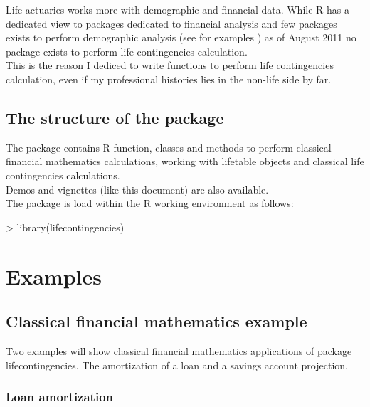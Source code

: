 \documentclass[a4paper]{article}
\begin{document}
Life actuaries works more with demographic and financial data. While R has a dedicated view to packages dedicated to financial analysis and 
few packages exists to perform demographic analysis (see for examples \cite{demography}) as of August 2011 no package exists to perform 
life contingencies calculation.\\
This is the reason I dediced to write functions to perform life contingencies calculation, even if my professional histories lies in the non-life 
side by far.\\


\subsection{The structure of the package}

The package contains R function, classes and methods to perform classical financial mathematics calculations, working with 
lifetable objects and classical life contingencies calculations.\\
Demos and vignettes (like this document) are also available.\\

The package is load within the R working environment as follows:

\begin{Schunk}
\begin{Sinput}
> library(lifecontingencies)
\end{Sinput}
\end{Schunk}



\clearpage
\newpage


\section{Examples} \label{sec:examples}

\subsection{Classical financial mathematics example}

Two examples will show classical financial mathematics applications of package lifecontingencies. The 
amortization of a loan and a savings account projection.\\

\subsubsection{Loan amortization}
\end{document}
